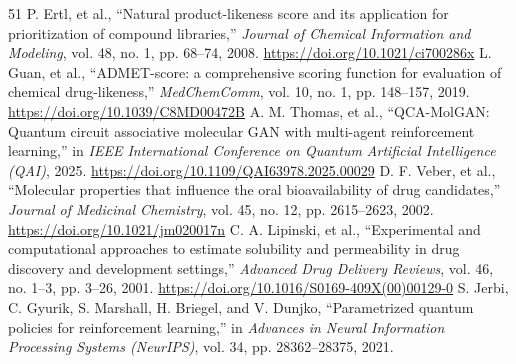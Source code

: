 \documentclass[10pt,a4paper]{article}
\begin{document}
\begin{thebibliography}{51}
 P. Ertl, et al., ``Natural product-likeness score and its application for prioritization of compound libraries,'' \textit{Journal of Chemical Information and Modeling}, vol. 48, no. 1, pp. 68--74, 2008. \url{https://doi.org/10.1021/ci700286x}
 L. Guan, et al., ``ADMET-score: a comprehensive scoring function for evaluation of chemical drug-likeness,'' \textit{MedChemComm}, vol. 10, no. 1, pp. 148--157, 2019. \url{https://doi.org/10.1039/C8MD00472B}
 A. M. Thomas, et al., ``QCA-MolGAN: Quantum circuit associative molecular GAN with multi-agent reinforcement learning,'' in \textit{IEEE International Conference on Quantum Artificial Intelligence (QAI)}, 2025. \url{https://doi.org/10.1109/QAI63978.2025.00029}
 D. F. Veber, et al., ``Molecular properties that influence the oral bioavailability of drug candidates,'' \textit{Journal of Medicinal Chemistry}, vol. 45, no. 12, pp. 2615--2623, 2002. \url{https://doi.org/10.1021/jm020017n}
 C. A. Lipinski, et al., ``Experimental and computational approaches to estimate solubility and permeability in drug discovery and development settings,'' \textit{Advanced Drug Delivery Reviews}, vol. 46, no. 1--3, pp. 3--26, 2001. \url{https://doi.org/10.1016/S0169-409X(00)00129-0}
 S. Jerbi, C. Gyurik, S. Marshall, H. Briegel, and V. Dunjko, ``Parametrized quantum policies for reinforcement learning,'' in \textit{Advances in Neural Information Processing Systems (NeurIPS)}, vol. 34, pp. 28362--28375, 2021.
\end{thebibliography}
\end{document}
